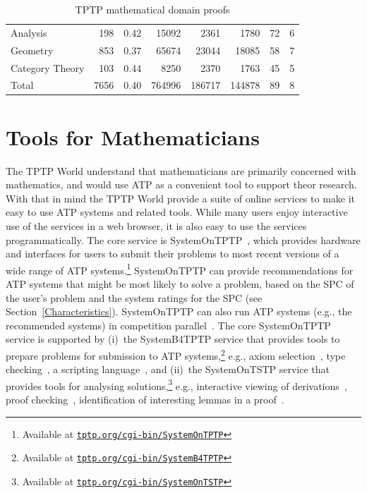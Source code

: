 \documentclass[runningheads]{llncs}
\begin{document}
\begin{table}[tb]
\begin{center}
\begin{tabular}{l|rr|rrrrr}
Analysis            &  198 & 0.42 &  15092 &  2361 &  1780 &   72 &     6 \\
Geometry            &  853 & 0.37 &  65674 & 23044 & 18085 &   58 &     7 \\
Category Theory     &  103 & 0.44 &   8250 &  2370 &  1763 &   45 &     5 \\
\hline
Total               & 7656 & 0.40 & 764996 &186717 &144878 &   89 &     8 \\
\end{tabular}
\end{center}
\caption{TPTP mathematical domain proofs}
\label{Proofs}
\end{table}

\section{Tools for Mathematicians}
\label{Tools}

The TPTP World understand that mathematicians are primarily concerned with mathematics, and would
use ATP as a convenient tool to support theor research.
With that in mind the TPTP World provide a suite of online services to make it easy to use ATP
systems and related tools.
While many users enjoy interactive use of the services in a web browser, it is also easy to use 
the services programmatically.
The core service is SystemOnTPTP~\cite{Sut00-CADE-17}, which provides hardware and interfaces 
for users to submit their problems to most recent versions of a wide range of ATP 
systems.\footnote{%
Available at \href{https://tptp.org/cgi-bin/SystemOnTPTP}{{\tt tptp.org/cgi-bin/SystemOnTPTP}}}
SystemOnTPTP can provide recommendations for ATP systems that might be most likely to solve
a problem, based on the SPC of the user's problem and the system ratings for the SPC
(see Section~\ref{Characteristics}).
SystemOnTPTP can also run ATP systems (e.g., the recommended systems) in competition
parallel~\cite{SS99-FLAIRS}.
The core SystemOnTPTP service is supported by (i)~the SystemB4TPTP service that provides tools to
prepare problems for submission to ATP systems,\footnote{%
Available at \href{https://tptp.org/cgi-bin/SystemB4TPTP}{{\tt tptp.org/cgi-bin/SystemB4TPTP}}}
e.g., axiom selection~\cite{HV11}, type checking~\cite{KSR16}, a scripting language~\cite{Sut14}, 
and (ii)~the SystemOnTSTP service that provides tools for analysing solutions,\footnote{%
Available at \href{https://tptp.org/cgi-bin/SystemOnTSTP}{{\tt tptp.org/cgi-bin/SystemOnTSTP}}} 
e.g., interactive viewing of derivations~\cite{TPS07}, proof checking~\cite{Sut06}, identification 
of interesting lemmas in a proof~\cite{PGS06}.
\end{document}

